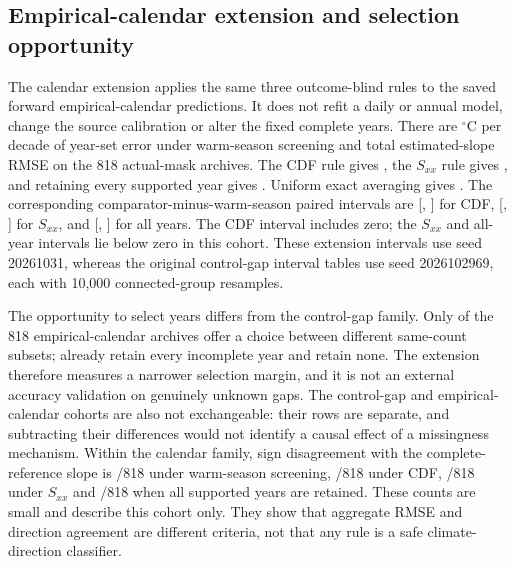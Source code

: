 \subsection{Empirical-calendar extension and selection opportunity}

The calendar extension applies the same three outcome-blind rules to the saved forward empirical-calendar predictions. It does not refit a daily or annual model, change the source calibration or alter the fixed complete years. There are \SRCalendarWarmTruthRMSE{} $^{\circ}$C per decade of year-set error under warm-season screening and \SRCalendarWarmRMSE{} total estimated-slope RMSE on the 818 actual-mask archives. The CDF rule gives \SRCalendarCDFRMSE{}, the $S_{xx}$ rule gives \SRCalendarSxxRMSE{}, and retaining every supported year gives \SRCalendarAllRMSE{}. Uniform exact averaging gives \SRCalendarUniformRMSE{}. The corresponding comparator-minus-warm-season paired intervals are \SRCalendarCDFDifference{} [\SRCalendarCDFLow, \SRCalendarCDFHigh] for CDF, \SRCalendarSxxDifference{} [\SRCalendarSxxLow, \SRCalendarSxxHigh] for $S_{xx}$, and \SRCalendarAllDifference{} [\SRCalendarAllLow, \SRCalendarAllHigh] for all years. The CDF interval includes zero; the $S_{xx}$ and all-year intervals lie below zero in this cohort. These extension intervals use seed 20261031, whereas the original control-gap interval tables use seed 2026102969, each with 10,000 connected-group resamples.

The opportunity to select years differs from the control-gap family. Only \SRCalendarChoiceN{} of the 818 empirical-calendar archives offer a choice between different same-count subsets; \SRCalendarAllKeptN{} already retain every incomplete year and \SRCalendarNoneKeptN{} retain none. The extension therefore measures a narrower selection margin, and it is not an external accuracy validation on genuinely unknown gaps. The control-gap and empirical-calendar cohorts are also not exchangeable: their rows are separate, and subtracting their differences would not identify a causal effect of a missingness mechanism. Within the calendar family, sign disagreement with the complete-reference slope is \SRCalendarSignWarm/818 under warm-season screening, \SRCalendarSignCDF/818 under CDF, \SRCalendarSignSxx/818 under $S_{xx}$ and \SRCalendarSignAll/818 when all supported years are retained. These counts are small and describe this cohort only. They show that aggregate RMSE and direction agreement are different criteria, not that any rule is a safe climate-direction classifier.


